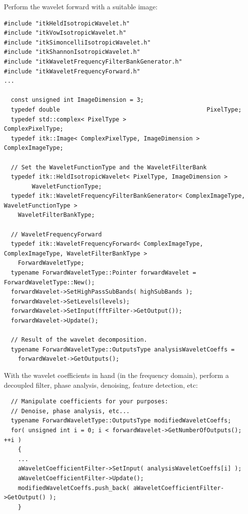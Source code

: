Perform the wavelet forward with a suitable image:
\begin{verbatim}
#include "itkHeldIsotropicWavelet.h"
#include "itkVowIsotropicWavelet.h"
#include "itkSimoncelliIsotropicWavelet.h"
#include "itkShannonIsotropicWavelet.h"
#include "itkWaveletFrequencyFilterBankGenerator.h"
#include "itkWaveletFrequencyForward.h"
...

  const unsigned int ImageDimension = 3;
  typedef double                                          PixelType;
  typedef std::complex< PixelType >                       ComplexPixelType;
  typedef itk::Image< ComplexPixelType, ImageDimension >  ComplexImageType;

  // Set the WaveletFunctionType and the WaveletFilterBank
  typedef itk::HeldIsotropicWavelet< PixelType, ImageDimension >
        WaveletFunctionType;
  typedef itk::WaveletFrequencyFilterBankGenerator< ComplexImageType, WaveletFunctionType >
    WaveletFilterBankType;

  // WaveletFrequencyForward
  typedef itk::WaveletFrequencyForward< ComplexImageType, ComplexImageType, WaveletFilterBankType >
    ForwardWaveletType;
  typename ForwardWaveletType::Pointer forwardWavelet = ForwardWaveletType::New();
  forwardWavelet->SetHighPassSubBands( highSubBands );
  forwardWavelet->SetLevels(levels);
  forwardWavelet->SetInput(fftFilter->GetOutput());
  forwardWavelet->Update();

  // Result of the wavelet decomposition.
  typename ForwardWaveletType::OutputsType analysisWaveletCoeffs =
    forwardWavelet->GetOutputs();
\end{verbatim}

With the wavelet coefficients in hand (in the frequency domain), perform a decoupled filter, phase analysis, denoising, feature detection, etc:
\begin{verbatim}
  // Manipulate coefficients for your purposes:
  // Denoise, phase analysis, etc...
  typename ForwardWaveletType::OutputsType modifiedWaveletCoeffs;
  for( unsigned int i = 0; i < forwardWavelet->GetNumberOfOutputs(); ++i )
    {
    ...
    aWaveletCoefficientFilter->SetInput( analysisWaveletCoeffs[i] );
    aWaveletCoefficientFilter->Update();
    modifiedWaveletCoeffs.push_back( aWaveletCoefficientFilter->GetOutput() );
    }
\end{verbatim}


